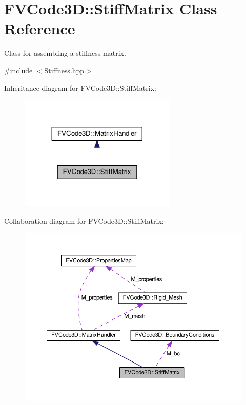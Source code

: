 \hypertarget{classFVCode3D_1_1StiffMatrix}{}\section{F\+V\+Code3D\+:\+:Stiff\+Matrix Class Reference}
\label{classFVCode3D_1_1StiffMatrix}


Class for assembling a stiffness matrix.  




{\ttfamily \#include $<$Stiffness.\+hpp$>$}



Inheritance diagram for F\+V\+Code3D\+:\+:Stiff\+Matrix\+:
\nopagebreak
\begin{figure}[H]
\begin{center}
\leavevmode
\includegraphics[width=212pt]{classFVCode3D_1_1StiffMatrix__inherit__graph}
\end{center}
\end{figure}


Collaboration diagram for F\+V\+Code3D\+:\+:Stiff\+Matrix\+:
\nopagebreak
\begin{figure}[H]
\begin{center}
\leavevmode
\includegraphics[width=350pt]{classFVCode3D_1_1StiffMatrix__coll__graph}
\end{center}
\end{figure}
